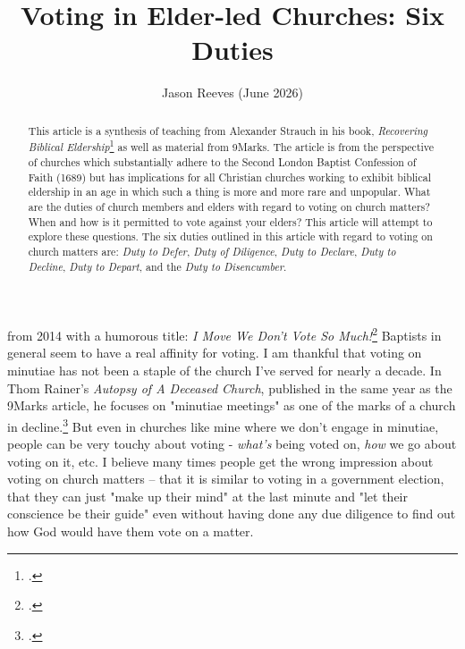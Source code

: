 

\title{Voting in Elder-led Churches: Six Duties}
\author{Jason Reeves (June 2026)}
\date{}




\ifdefined\embedversion
  \pagestyle{empty}
\fi

\maketitle
{}

\begin{abstract}
This article is a synthesis of teaching from Alexander Strauch in his book, \textit{Recovering Biblical Eldership}\footcite{strauch2000recovering} as well as material from 9Marks.  The article is from the perspective of churches which substantially adhere to the Second London Baptist Confession of Faith (1689) but has implications for all Christian churches working to exhibit biblical eldership in an age in which such a thing is more and more rare and unpopular.  What are the duties of church members and elders with regard to voting on church matters?  When and how is it permitted to vote against your elders?  This article will attempt to explore these questions.
\newline
\newline
The six duties outlined in this article with regard to voting on church matters are: \textit{Duty to Defer}, \textit{Duty of Diligence}, \textit{Duty to Declare}, \textit{Duty to Decline}, \textit{Duty to Depart}, and the \textit{Duty to Disencumber}.
\end{abstract}

 from 2014 with a humorous title: \textit{I Move We Don't Vote So Much!}\footcite{gilbert2014}  Baptists in general seem to have a real affinity for voting.  I am thankful that voting on minutiae has not been a staple of the church I've served for nearly a decade.  In Thom Rainer's \textit{Autopsy of A Deceased Church}, published in the same year as the 9Marks article, he focuses on "minutiae meetings" as one of the marks of a church in decline.\footcite{rainer2014}  But even in churches like mine where we don't engage in minutiae, people can be very touchy about voting - \textit{what's} being voted on, \textit{how} we go about voting on it, etc.  I believe many times people get the wrong impression about voting on church matters -- that it is similar to voting in a government election, that they can just "make up their mind" at the last minute and "let their conscience be their guide" even without having done any due diligence to find out how God would have them vote on a matter.

